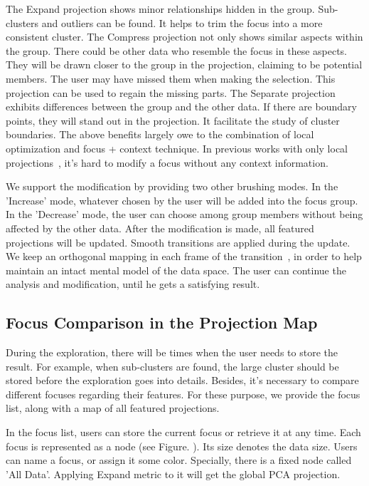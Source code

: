 The Expand projection shows minor relationships hidden in the group. Sub-clusters and outliers can be found. It helps to trim the focus into a more consistent cluster. The Compress projection not only shows similar aspects within the group. There could be other data who resemble the focus in these aspects. They will be drawn closer to the group in the projection, claiming to be potential members. The user may have missed them when making the selection. This projection can be used to regain the missing parts. The Separate projection exhibits differences between the group and the other data. If there are boundary points, they will stand out in the projection. It facilitate the study of cluster boundaries. The above benefits largely owe to the combination of local optimization and focus + context technique. In previous works with only local projections~\cite{DBLP:journals/tvcg/YuanRWG13}, it's hard to modify a focus without any context information.

We support the modification by providing two other brushing modes. In the 'Increase' mode, whatever chosen by the user will be added into the focus group. In the 'Decrease' mode, the user can choose among group members without being affected by the other data. After the modification is made, all featured projections will be updated. Smooth transitions are applied during the update. We keep an orthogonal mapping in each frame of the transition~\cite{cook2004computational}, in order to help maintain an intact mental model of the data space. The user can continue the analysis and modification, until he gets a satisfying result.

\subsection{Focus Comparison in the Projection Map}
During the exploration, there will be times when the user needs to store the result. For example, when sub-clusters are found, the large cluster should be stored before the exploration goes into details. Besides, it's necessary to compare different focuses regarding their features. For these purpose, we provide the focus list, along with a map of all featured projections.

In the focus list, users can store the current focus or retrieve it at any time. Each focus is represented as a node (see Figure. ). Its size denotes the data size. Users can name a focus, or assign it some color. Specially, there is a fixed node called 'All Data'. Applying Expand metric to it will get the global PCA projection.

